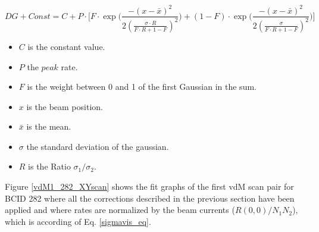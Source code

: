 \begin{equation}
DG+Const= C+P \cdot \Biggl[ F \cdot \exp \Biggl( \frac{-(x-\bar{x})^{2}}{2(\frac{\sigma\cdot R}{F \cdot R+1-F} )^{2} } \Biggr) + (1-F) \cdot \exp \Biggl( \frac{-(x-\bar{x})^{2}}{2 (\frac{\sigma}{F \cdot R+1-F} )^{2} } \Biggr) \Biggr] 
\end{equation}
\begin{itemize}
\item $C$ is the constant value.
\item $P$ the $peak$ rate.
\item $F$ is the weight between 0 and 1 of the first Gaussian in the sum.
\item $x$ is the beam position.
\item $\bar{x}$ is the mean.
\item $\sigma$ the standard deviation of the gaussian.
\item $R$ is the Ratio $\sigma_{1}/\sigma_{2}$.
\end{itemize}

Figure \ref{vdM1_282_XYscan} shows the fit graphs of the first vdM scan pair for BCID 282 where  all the corrections described in the previous section have been applied and where  rates are normalized by the beam currents ($R(0,0)/N_{1}N_{2}$), which is according of Eq. \ref{sigmavis_eq}.

